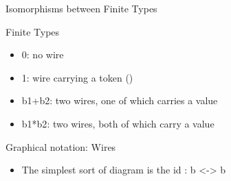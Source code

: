 \documentclass[11pt]{beamer}
\newcommand{\red}[1]{{\color{red}{#1}}}
\begin{document}
\begin{frame}{}

\vfill
{\Large \centerline{Isomorphisms between Finite Types}}

\vfill

\end{frame}


\begin{frame}{Finite Types}


\begin{itemize}

  \vfill\item 0: no wire

  \vfill\item 1: wire carrying a token {{()}}

  \vfill\item {{b1+b2}}: two wires, one of which carries a value 
  \red{(particle)}

  \vfill\item {{b1*b2}}: two wires, both of which carry a value 
  \red{(wave)}

\end{itemize}

\vfill

\end{frame}

\begin{frame}{Graphical notation: Wires} 

\begin{itemize}
\item The simplest sort of diagram is the {{id : b <-> b}} 
\end{itemize}

\begin{multicols}{2}
\begin{center}
\end{center}
\begin{center}
\end{center}
\end{multicols}

\end{frame}
\end{document}
